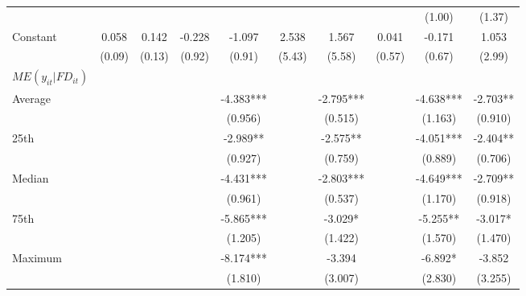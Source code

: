 \documentclass[12pt, a4paper]{article}
\begin{document}
\begin{table}
\begin{threeparttable}
{\begin{tabular}{l*{9}{c}}
				&                     &                     &                     &                     &                     &                     &                     &      (1.00)         &      (1.37)         \\
				Constant            &       0.058         &       0.142         &      -0.228         &      -1.097         &       2.538         &       1.567         &       0.041         &      -0.171         &       1.053         \\
				&      (0.09)         &      (0.13)         &      (0.92)         &      (0.91)         &      (5.43)         &      (5.58)         &      (0.57)         &      (0.67)         &      (2.99)         \\
				\hline
				$ME(y_{it}|FD_{it})$ \\
				Average&&&&	-4.383***	&&	-2.795***	&&	-4.638***	&	-2.703** \\
				&&&&(0.956)   	&&	(0.515)   	&&	(1.163)  &		(0.910)   \\
				
				25th&&&&	-2.989** 	&&	-2.575** 	&&	-4.051***	&	-2.404** \\
				&&&&(0.927)  &&		(0.759)   &&		(0.889)   	&	(0.706)   \\
				
				Median&&&&	-4.431***	&&	-2.803***	&&	-4.649***	&	-2.709** \\
				&&&&(0.961)  &&		(0.537)  && 		(1.170) & 		(0.918)   \\
				
				75th&&&&	-5.865***	&&	-3.029*  &&		-5.255** 	&	-3.017*  \\
				&&&&(1.205)  && 		(1.422)   &&		(1.570)   &		(1.470)   \\
				
				Maximum	&&&&-8.174***	&&	-3.394   &&		-6.892*  &		-3.852   \\
				&&&&(1.810)   	&&	(3.007)   	&&	(2.830) &		(3.255)   \\
				

\end{tabular}}
\end{threeparttable}
\end{table}
\end{document}
